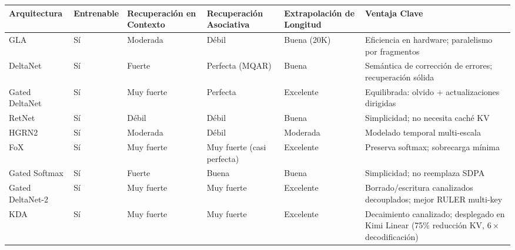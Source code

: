\footnotesize
\begin{longtable}{p{1.8cm}p{2.0cm}p{2.2cm}p{2.2cm}p{2.2cm}p{1.8cm}}
\toprule
\textbf{Arquitectura} & \textbf{Entrenable} & \textbf{Recuperación en Contexto} & \textbf{Recuperación Asociativa} & \textbf{Extrapolación de Longitud} & \textbf{Ventaja Clave} \\
\midrule
\endhead
GLA & Sí & Moderada & Débil & Buena (20K) & Eficiencia en hardware; paralelismo por fragmentos \\
DeltaNet & Sí & Fuerte & Perfecta (MQAR) & Buena & Semántica de corrección de errores; recuperación sólida \\
Gated DeltaNet & Sí & Muy fuerte & Perfecta & Excelente & Equilibrada: olvido + actualizaciones dirigidas \\
RetNet & Sí & Débil & Débil & Buena & Simplicidad; no necesita caché KV \\
HGRN2 & Sí & Moderada & Débil & Moderada & Modelado temporal multi-escala \\
FoX & Sí & Muy fuerte & Muy fuerte (casi perfecta) & Excelente & Preserva softmax; sobrecarga mínima \\
Gated Softmax & Sí & Fuerte & Buena & Buena & Simplicidad; no reemplaza SDPA \\
Gated DeltaNet-2 & Sí & Muy fuerte & Muy fuerte & Excelente & Borrado/escritura canalizados decouplados; mejor RULER multi-key \\
KDA & Sí & Muy fuerte & Muy fuerte & Excelente & Decaimiento canalizado; desplegado en Kimi Linear (75\% reducción KV, $6\times$ decodificación) \\
\bottomrule
\end{longtable}
\normalsize

\medskip

